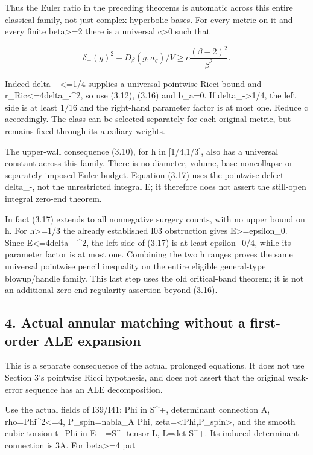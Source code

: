 \documentclass[
  10pt,
]{article}
\begin{document}
Thus the Euler ratio in the preceding theorems is automatic across this
entire classical family, not just complex-hyperbolic bases. For every
metric on it and every finite beta\textgreater=2 there is a universal
c\textgreater0 such that

\[
 \boxed{\delta_-(g)^2+D_\beta(g,a_g)/V
             \ge c\frac{(\beta-2)^2}{\beta^2}.}     \tag{3.17}
\]

Indeed delta\_-\textless=1/4 supplies a universal pointwise Ricci bound
and r\_Ric\textless=4delta\_-\^{}2, so use (3.12), (3.16) and b\_a=0. If
delta\_-\textgreater1/4, the left side is at least 1/16 and the
right-hand parameter factor is at most one. Reduce c accordingly. The
class can be selected separately for each original metric, but remains
fixed through its auxiliary weights.

The upper-wall consequence (3.10), for h in {[}1/4,1/3{]}, also has a
universal constant across this family. There is no diameter, volume,
base noncollapse or separately imposed Euler budget. Equation (3.17)
uses the pointwise defect delta\_-, not the unrestricted integral E; it
therefore does not assert the still-open integral zero-end theorem.

In fact (3.17) extends to all nonnegative surgery counts, with no upper
bound on h. For h\textgreater=1/3 the already established I03
obstruction gives E\textgreater=epsilon\_0. Since
E\textless=4delta\_-\^{}2, the left side of (3.17) is at least
epsilon\_0/4, while its parameter factor is at most one. Combining the
two h ranges proves the same universal pointwise pencil inequality on
the entire eligible general-type blowup/handle family. This last step
uses the old critical-band theorem; it is not an additional zero-end
regularity assertion beyond (3.16).

\hypertarget{actual-annular-matching-without-a-first-order-ale-expansion}{%
\subsection{4. Actual annular matching without a first-order ALE
expansion}\label{actual-annular-matching-without-a-first-order-ale-expansion}}

This is a separate consequence of the actual prolonged equations. It
does not use Section 3's pointwise Ricci hypothesis, and does not assert
that the original weak-error sequence has an ALE decomposition.

Use the actual fields of I39/I41: Phi in S\^{}+, determinant connection
A, rho=\textbar Phi\textbar\^{}2\textless=4, P\_spin=nabla\_A Phi,
zeta=\textless Phi,P\_spin\textgreater, and the smooth cubic torsion
t\_Phi in E\_-=S\^{}- tensor L, L=det S\^{}+. Its induced determinant
connection is 3A. For beta\textgreater=4 put
\end{document}
